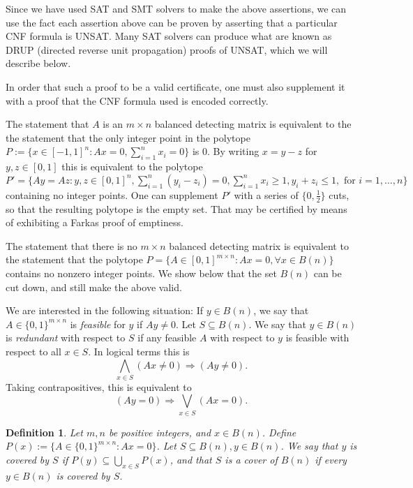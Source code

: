 \documentclass{article}
\newtheorem{definition}{Definition}
\begin{document}
Since we have used SAT and SMT solvers to make the above assertions,
we can use the fact each assertion above can be proven by asserting
that a particular CNF formula is UNSAT.  Many SAT solvers can produce
what are known as DRUP (directed reverse unit propagation) proofs of
UNSAT, which we will describe below.

In order that such a proof to be a valid certificate, one must also
supplement it with a proof that the CNF formula used is encoded
correctly.

The statement that $A$ is an $m \times n$ balanced detecting matrix is
equivalent to the the statement that the only integer point in the
polytope $P := \{x \in [-1,1]^n : A x = 0, \sum_{i=1}^n x_i = 0 \}$ is
$0$.  By writing $x = y-z$ for $y,z \in [0,1]$ this is equivalent to
the polytope
$P' = \{A y = Az : y, z \in [0,1]^n, \sum_{i=1}^n (y_i - z_i) = 0,
\sum_{i=1}^n x_i \ge 1, y_i + z_i \le 1, \text{ for } i=1, \dots, n\}$
containing no integer points.  One can supplement $P'$ with a series
of $\{0, \frac 1 2 \}$ cuts, so that the resulting polytope is the
empty set.  That may be certified by means of exhibiting a Farkas
proof of emptiness.

The statement that there is no $m \times n$ balanced detecting matrix
is equivalent to the statement that the polytope
$P = \{A \in [0,1]^{m \times n} : A x = 0, \forall x \in B(n)\}$
contains no nonzero integer points.  We show below that the set $B(n)$
can be cut down, and still make the above valid.

We are interested in the following situation: If $y \in B(n)$, we say
that $A \in \{0,1\}^{m \times n}$ is \emph{feasible} for $y$ if $Ay
\ne 0$.  Let $S \subseteq B(n)$. We say that $y \in B(n)$ is
\emph{redundant} with respect to $S$ if any feasible $A$ with respect
to $y$ is feasible with respect to all $x \in S$.  In logical terms
this is
\begin{displaymath}
  \bigwedge_{x \in S} (A x \ne 0) \Rightarrow (Ay \ne 0).
\end{displaymath}
Taking contrapositives, this is equivalent to
\begin{displaymath}
  (Ay = 0) \Rightarrow \bigvee_{x \in S} (Ax = 0).
\end{displaymath}

\begin{definition}
  Let $m, n$ be positive integers, and $x \in B(n)$.  Define
  $P(x) := \{ A \in \{0,1\}^{m \times n} : A x = 0\}$.  Let $S
  \subseteq B(n), y \in B(n)$. We say that $y$ is \emph{covered by
    $S$} if $P(y) \subseteq \bigcup_{x \in S} P(x)$, and that $S$ is a
  \emph{cover} of $B(n)$ if every $y \in B(n)$ is covered by $S$.
\end{definition}





\end{document}
